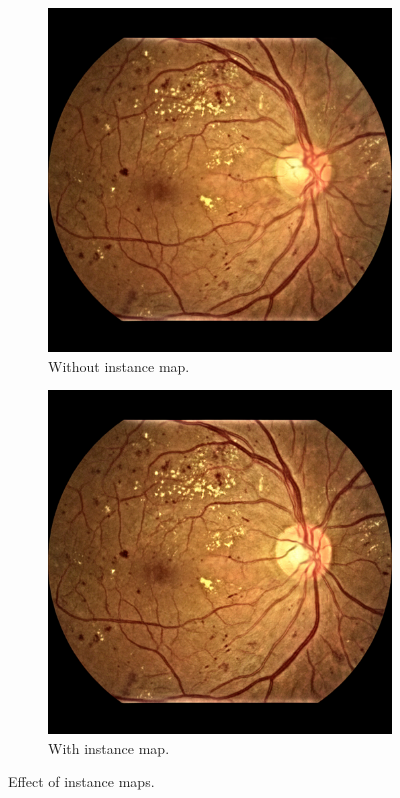 \begin{figure}[h]
    \centering
    \begin{subfigure}{0.40\textwidth}
        \centering
        \includegraphics[width=\linewidth]{retinas/figs/no_inst.png}
        \caption{Without instance map.}
        \label{fig:without_inst}
    \end{subfigure} %
    \begin{subfigure}{0.40\textwidth}
        \centering
        \includegraphics[width=\linewidth]{retinas/figs/with_inst.png}
        \caption{With instance map.}
        \label{fig:with_inst}
    \end{subfigure}
    \caption{Effect of instance maps.}
    \label{fig:with_without_instance}
\end{figure}

